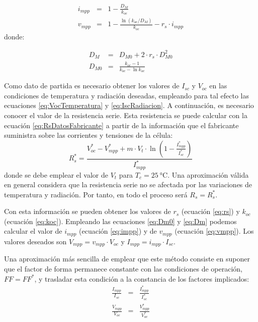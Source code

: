 \begin{eqnarray}
i_{mpp} & = & 1-\frac{D_{M}}{k_{oc}}\label{eq:impp}\\
v_{mpp} & = & 1-\frac{\ln(k_{oc}/D_{M})}{k_{oc}}-r_{s}\cdot i_{mpp}\label{eq:vmpp}\end{eqnarray}
 donde:

\begin{eqnarray}
D_{M} & = & D_{M0}+2\cdot r_{s}\cdot D_{M0}^{2}\label{eq:Dm}\\
D_{M0} & = & \frac{k_{oc}-1}{k_{oc}-\ln k_{oc}}\label{eq:Dm0}\end{eqnarray}


Como dato de partida es necesario obtener los valores de $I_{sc}$
y $V_{oc}$ en las condiciones de temperatura y radiación deseadas,
empleando para tal efecto las ecuaciones \ref{eq:VocTemperatura}
y \ref{eq:IscRadiacion}. A continuación, es necesario conocer el
valor de la resistencia serie. Esta resistencia se puede calcular
con la ecuación \ref{eq:RsDatosFabricante} a partir de la información
que el fabricante suministra sobre las corrientes y tensiones de la
célula: \begin{equation}
R_{s}^{*}=\frac{V_{oc}^{*}-V_{mpp}^{*}+m\cdot V_{t}\cdot\ln(1-\frac{I_{mpp}^{*}}{I_{sc}^{*}})}{I_{mpp}^{*}}\label{eq:RsDatosFabricante}\end{equation}
donde se debe emplear el valor de $V_{t}$ para $T_{c}=\SI{25}{\celsius}$.
Una aproximación válida en general considera que la resistencia serie
no se afectada por las variaciones de temperatura y radiación. Por
tanto, en todo el proceso será $R_{s}=R_{s}^{*}$.

Con esta información se pueden obtener los valores de $r_{s}$ (ecuación
\ref{eq:rs}) y $k_{oc}$ (ecuación \ref{eq:koc}). Empleando las
ecuaciones \ref{eq:Dm0} y \ref{eq:Dm} podemos calcular el valor
de $i_{mpp}$ (ecuación \ref{eq:impp}) y de $v_{mpp}$ (ecuación
\ref{eq:vmpp}). Los valores deseados son $V_{mpp}=v_{mpp}\cdot V_{oc}$
y $I_{mpp}=i_{mpp}\cdot I_{sc}$.

Una aproximación más sencilla de emplear que este método consiste
en suponer que el factor de forma permanece constante con las condiciones
de operación, $FF=FF^{*}$, y trasladar esta condición a la constancia
de los factores implicados:\begin{eqnarray}
\frac{I_{mpp}}{I_{sc}} & = & \frac{I_{mpp}^{*}}{I_{sc}^{*}}\label{eq:ImppFactorFormaConstante}\\
\frac{V_{mpp}}{V_{oc}} & = & \frac{V_{mpp}^{*}}{V_{oc}^{*}}\label{eq:VmppFactorFormaConstante}\end{eqnarray}


